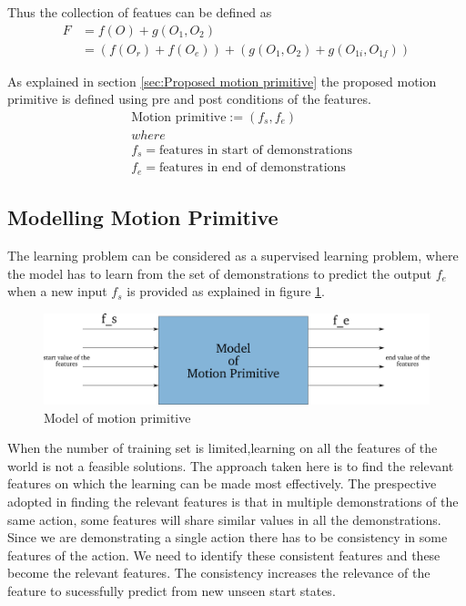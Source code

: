 Thus the collection of featues can be defined as 
\begin{equation}
    \begin{aligned}
    F &= f(O) + g(O_1 , O_2) \\
      &= (f(O_r) + f(O_e))  +  (g(O_1, O_2) + g(O_{1i}, O_{1f}))
    \end{aligned}
\end{equation}

As explained in section \ref{sec:Proposed motion primitive}
the proposed motion primitive is defined using pre and post conditions of the features.
\begin{equation}
    \begin{aligned}
    & \text{Motion primitive} := (f_s, f_e ) \\
    & where  \nonumber \\ 
    &    f_s = \text{features in start of demonstrations} \nonumber\\
    &    f_e = \text{features in end of demonstrations} \nonumber
    \end{aligned}
\end{equation}



\subsection{Modelling Motion Primitive}

The learning problem can be considered as a supervised learning problem, where 
the model has to learn from the set of demonstrations to predict the output
$f_e$ when a new input $f_s$ is provided as explained in figure \ref{model}.
\begin{figure}[htp]
\centering
\includegraphics[scale=0.40]{images/model.png}
\caption{Model of motion primitive}
\label{model}
\end{figure}

When the number of training set is limited,learning on
 all the features of the world is not a feasible solutions.
 The approach taken here is to find the relevant features on which the 
learning can be made most effectively.
The prespective adopted in finding the relevant features is that in multiple
demonstrations of the same action, some features will share similar values 
in all the demonstrations. Since we are demonstrating a single action
there has to be consistency in some features of the action.
We need to identify these consistent features and these become the relevant
features. The consistency increases the relevance of the feature to
sucessfully predict from new unseen start states.

